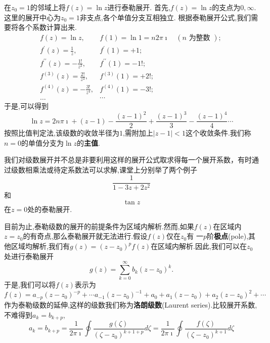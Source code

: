 \begin{examplebox}{在$z_0=1$的邻域上将$f(z) = \ln{z}$进行泰勒展开.}
    首先,$f(z) = \ln z $的支点为$0,\infty$.这里的展开中心为$z_0=1$非支点,各个单值分支互相独立.
    根据泰勒展开公式,我们需要将各个系数计算出来.
    \[
        \begin{array}{ll}
            f(z)=\ln z, & f(1)=\ln 1=n 2 \pi \imath \quad(n \text { 为整数 }) \text {; } \\
            f^{\prime}(z)=\frac{1}{z}, & f^{\prime}(1)=+1 ; \\
            f^{\prime \prime}(z)=-\frac{1 !}{z^2}, & f^{\prime \prime}(1)=-1 ! ; \\
            f^{(3)}(z)=\frac{2 !}{z^3}, & f^{(3)}(1)=+2 ! ; \\
            f^{(4)}(z)=-\frac{3 !}{z^4}, & f^{(4)}(1)=-3 ! ; \\
            \ldots & \cdots
            \end{array}
    \]
    于是,可以得到
    \[
    \ln z = 2 n \pi \imath + (z-1) - \frac{(z-1)^2}{2} +  \frac{(z-1)^3}{3} -  \frac{(z-1)^4}{4} \cdots
    \]
    按照比值判定法,该级数的收敛半径为$1$,需附加上$|z-1|< 1$这个收敛条件.我们称$n=0$的单值分支为$\ln z $的\textbf{主值}.
\end{examplebox}
我们对级数展开并不总是非要利用这样的展开公式取求得每一个展开系数，有时通过级数相乘法或待定系数法可以求解,课堂上分别举了两个例子
$$
\frac{1}{1-3z + 2z^2}
$$
和$$
\tan{z}
$$
在$z=0$处的泰勒展开.

目前为止,泰勒级数的展开的前提条件为区域内解析.然而,如果$f(z)$在区域内$z=z_0$的有奇点,那么泰勒展开就无法进行.假设$f(z)$仅在$z_0$有
一$p$阶\textbf{极点}(pole),其他区域均解析,我们有$g(z) = (z-z_0)^p f(z)$在区域内解析.因此,我们可以在$z_0$处进行泰勒展开
\begin{equation}
    g(z) = \sum_{k=0}^{\infty} b_k (z-z_0)^{k} .
\end{equation}
于是,我们可以将$f(z)$表示为
\begin{equation}
    f(z) = a_{-p} (z-z_0)^{-p} + \cdots a_{-1}(z-z_0)^{-1} + a_0 + a_{1} (z-z_0) + a_{2} (z-z_0)^2 + \cdots 
\end{equation}
作为泰勒级数的延伸,这样的级数我们称为\textbf{洛朗级数}(Laurent series).比较展开系数,不难得到$a_k = b_{k+p}$,
\begin{equation}
    a_k = b_{k+p} = \frac{1}{2\pi \imath} \oint \frac{g(\zeta)}{(\zeta - z_0)^{k+1+p}} d\zeta 
    = \frac{1}{2\pi \imath} \oint \frac{f(\zeta)}{(\zeta - z_0)^{k+1}} d\zeta
\end{equation}

